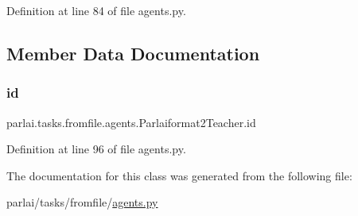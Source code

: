 Definition at line 84 of file agents.\+py.



\subsection{Member Data Documentation}
\mbox{\label{classparlai_1_1tasks_1_1fromfile_1_1agents_1_1Parlaiformat2Teacher_aeea3091d7296c9abc5376a3b920a31b8}} 
\subsubsection{\texorpdfstring{id}{id}}
{\footnotesize\ttfamily parlai.\+tasks.\+fromfile.\+agents.\+Parlaiformat2\+Teacher.\+id}



Definition at line 96 of file agents.\+py.



The documentation for this class was generated from the following file\+:\begin{DoxyCompactItemize}
\item 
parlai/tasks/fromfile/\hyperlink{parlai_2tasks_2fromfile_2agents_8py}{agents.\+py}\end{DoxyCompactItemize}
